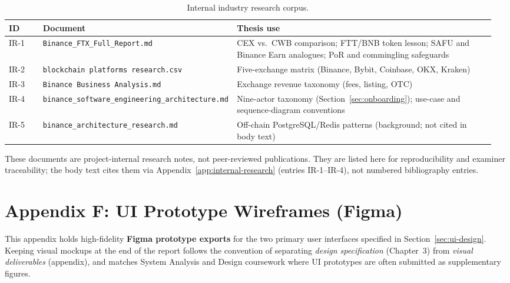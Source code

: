 \documentclass[12pt,a4paper]{report}
\newcommand{\tableheadcolor}{\rowcolor{TableHeadBg}}
\begin{document}
\begin{table}[H]
\centering
\caption[Internal industry research corpus]{Internal industry research corpus.}
\label{tab:internal-research}
\begingroup
\footnotesize
\setlength{\tabcolsep}{4pt}
\renewcommand{\arraystretch}{1.15}
\begin{tabular}{@{}%
  >{\raggedright\arraybackslash}p{0.07\linewidth}%
  >{\raggedright\arraybackslash}p{0.36\linewidth}%
  >{\raggedright\arraybackslash}p{0.53\linewidth}@{}}
\toprule
\tableheadcolor
\textbf{ID} & \textbf{Document} & \textbf{Thesis use} \\
\midrule
IR-1 & \texttt{Binance\_FTX\_Full\_Report.md} & CEX vs.\ CWB comparison; FTT/BNB token lesson; SAFU and Binance Earn analogues; PoR and commingling safeguards \\
IR-2 & \texttt{blockchain platforms research.csv} & Five-exchange matrix (Binance, Bybit, Coinbase, OKX, Kraken) \\
IR-3 & \texttt{Binance Business Analysis.md} & Exchange revenue taxonomy (fees, listing, OTC) \\
IR-4 & \texttt{binance\_software\_engineering\_architecture.md} & Nine-actor taxonomy (Section~\ref{sec:onboarding}); use-case and sequence-diagram conventions \\
IR-5 & \texttt{binance\_architecture\_research.md} & Off-chain PostgreSQL/Redis patterns (background; not cited in body text) \\
\bottomrule
\end{tabular}
\endgroup
\end{table}

\noindent These documents are project-internal research notes, not peer-reviewed publications. They are listed here for reproducibility and examiner traceability; the body text cites them via Appendix~\ref{app:internal-research} (entries IR-1--IR-4), not numbered bibliography entries.

\chapter*{Appendix F: UI Prototype Wireframes (Figma)}
{}
\label{app:ui-prototypes}

This appendix holds high-fidelity \textbf{Figma prototype exports} for the two primary user interfaces specified in Section~\ref{sec:ui-design}. Keeping visual mockups at the end of the report follows the convention of separating \textit{design specification} (Chapter~3) from \textit{visual deliverables} (appendix), and matches System Analysis and Design coursework where UI prototypes are often submitted as supplementary figures.
\end{document}
